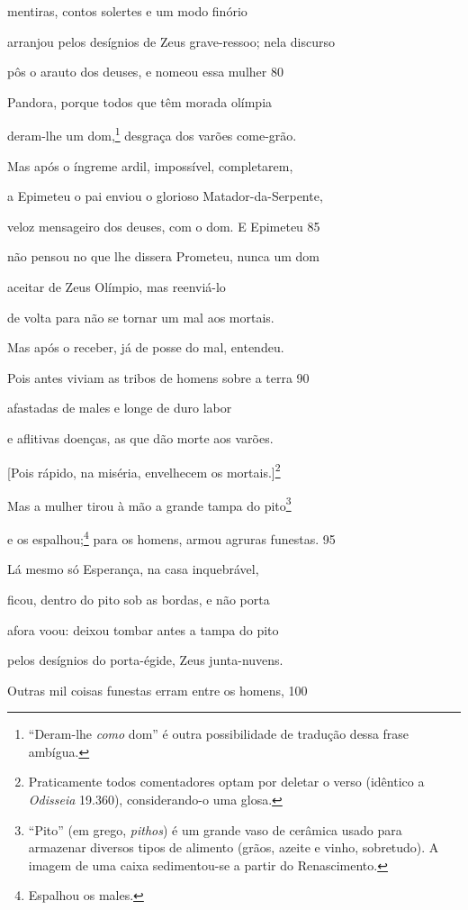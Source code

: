mentiras, contos solertes e um modo finório

arranjou pelos desígnios de Zeus grave-ressoo; nela discurso

pôs o arauto dos deuses, e nomeou essa mulher \num{80}

Pandora, porque todos que têm morada olímpia

deram-lhe um dom,\footnote{``Deram-lhe \emph{como} dom'' é outra possibilidade de tradução dessa frase ambígua.} desgraça dos varões come-grão.

Mas após o íngreme ardil, impossível, completarem,

a Epimeteu o pai enviou o glorioso Matador-da-Serpente,

veloz mensageiro dos deuses, com o dom. E Epimeteu \num{85}

não pensou no que lhe dissera Prometeu, nunca um dom

aceitar de Zeus Olímpio, mas reenviá-lo

de volta para não se tornar um mal aos mortais.

Mas após o receber, já de posse do mal, entendeu.

Pois antes viviam as tribos de homens sobre a terra \num{90}

afastadas de males e longe de duro labor

e aflitivas doenças, as que dão morte aos varões.

{[}Pois rápido, na miséria, envelhecem os mortais.{]}\footnote{Praticamente todos comentadores optam por deletar o verso (idêntico
a \emph{Odisseia} 19.360), considerando-o uma glosa.}

Mas a mulher tirou à mão a grande tampa do pito\footnote{``Pito'' (em grego, \emph{pithos}) é um grande vaso de cerâmica
usado para armazenar diversos tipos de alimento (grãos, azeite e vinho,
sobretudo). A imagem de uma caixa sedimentou-se a partir do
Renascimento.}

e os espalhou;\footnote{Espalhou os males.} para os homens, armou agruras funestas. \num{95}

Lá mesmo só Esperança, na casa inquebrável,

ficou, dentro do pito sob as bordas, e não porta

afora voou: deixou tombar antes a tampa do pito

pelos desígnios do porta-égide, Zeus junta-nuvens.

Outras mil coisas funestas erram entre os homens, \num{100}

